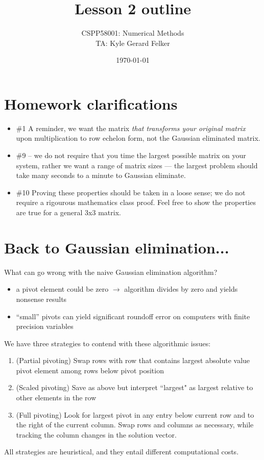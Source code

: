 \documentclass[11pt]{article}
\begin{document}
\title{Lesson 2 outline} 
\author{CSPP58001: Numerical Methods \\ TA: Kyle Gerard Felker}
\date{\today}
\maketitle

\section{Homework clarifications}

\begin{itemize}
\item \#1 A reminder, we want the matrix \emph{that transforms your original matrix} upon multiplication to row echelon form, not the Gaussian eliminated matrix.

\item \#9 -- we do not require that you time the largest possible matrix on your system, rather we want a range of matrix sizes --- the largest problem should take many seconds to a minute to Gaussian eliminate. 

\item \#10 Proving these properties should be taken in a loose sense; we do not require a rigourous mathematics class proof. Feel free to show the properties are true for a general 3x3 matrix. 

\end{itemize}
\section{Back to Gaussian elimination...}
What can go wrong with the naive Gaussian elimination algorithm?

\begin{itemize}
\item a pivot element could be zero $\rightarrow$ algorithm divides by zero and yields nonsense results

\item ``small'' pivots can yield significant roundoff error on computers with finite precision variables
\end{itemize}
We have three strategies to contend with these algorithmic issues:

\begin{enumerate}
\item (Partial pivoting) Swap rows with row that contains largest absolute value pivot element among rows below pivot position

\item (Scaled pivoting) Save as above but interpret ``largest" as largest relative to other elements in the row

\item (Full pivoting) Look for largest pivot in any entry below current row and to the right of the current column. Swap rows and columns as necessary, while tracking the column changes in the solution vector.

\end{enumerate}
All strategies are heuristical, and they entail different computational costs. 
\end{document}
